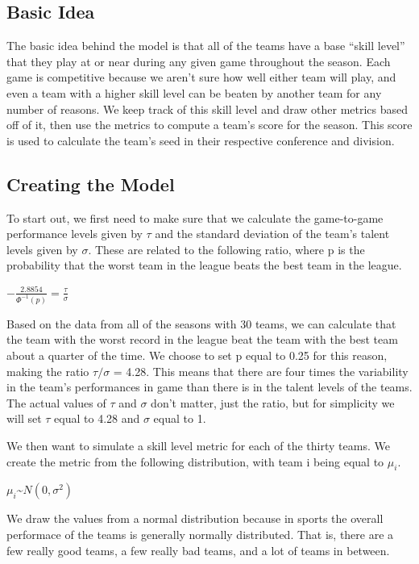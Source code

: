 \documentclass[
]{article}
\begin{document}
\hypertarget{basic-idea}{%
\subsection{Basic Idea}\label{basic-idea}}

The basic idea behind the model is that all of the teams have a base
``skill level'' that they play at or near during any given game
throughout the season. Each game is competitive because we aren't sure
how well either team will play, and even a team with a higher skill
level can be beaten by another team for any number of reasons. We keep
track of this skill level and draw other metrics based off of it, then
use the metrics to compute a team's score for the season. This score is
used to calculate the team's seed in their respective conference and
division.

\hypertarget{creating-the-model}{%
\subsection{Creating the Model}\label{creating-the-model}}

To start out, we first need to make sure that we calculate the
game-to-game performance levels given by \(\tau\) and the standard
deviation of the team's talent levels given by \(\sigma\). These are
related to the following ratio, where p is the probability that the
worst team in the league beats the best team in the league.

\(-\frac{2.8854}{\Phi^{-1}(p)} = \frac{\tau}{\sigma}\)

Based on the data from all of the seasons with 30 teams, we can
calculate that the team with the worst record in the league beat the
team with the best team about a quarter of the time. We choose to set p
equal to 0.25 for this reason, making the ratio \(\tau/\sigma\) = 4.28.
This means that there are four times the variability in the team's
performances in game than there is in the talent levels of the teams.
The actual values of \(\tau\) and \(\sigma\) don't matter, just the
ratio, but for simplicity we will set \(\tau\) equal to 4.28 and
\(\sigma\) equal to 1.

We then want to simulate a skill level metric for each of the thirty
teams. We create the metric from the following distribution, with team i
being equal to \(\mu_{i}\).

\(\mu_{i}\)\textasciitilde{}\(N(0,\sigma^{2})\)

We draw the values from a normal distribution because in sports the
overall performace of the teams is generally normally distributed. That
is, there are a few really good teams, a few really bad teams, and a lot
of teams in between.
\end{document}
